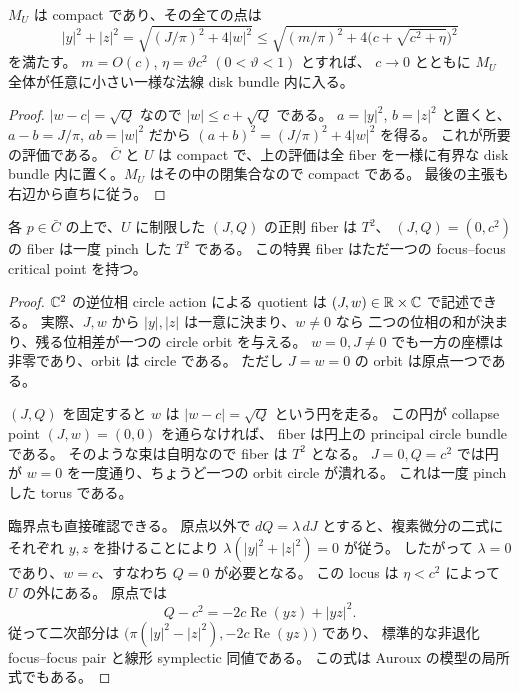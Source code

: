 \begin{lemma}\label{lc:construction-radius}
$M_U$ は compact であり、その全ての点は
\begin{equation}\label{lc:construction-radius-formula}
 |y|^2+|z|^2
 =\sqrt{(J/\pi)^2+4|w|^2}
 \le\sqrt{(m/\pi)^2+4\bigl(c+\sqrt{c^2+\eta}\bigr)^2}
\end{equation}
を満たす。
$m=O(c)$, $\eta=\vartheta c^2$ $(0<\vartheta<1)$ とすれば、
$c\to0$ とともに $M_U$ 全体が任意に小さい一様な法線 disk bundle 内に入る。
\end{lemma}

\begin{proof}
$|w-c|=\sqrt Q$ なので $|w|\le c+\sqrt Q$ である。
$a=|y|^2$, $b=|z|^2$ と置くと、
$a-b=J/\pi$, $ab=|w|^2$ だから
$(a+b)^2=(J/\pi)^2+4|w|^2$ を得る。
これが所要の評価である。
$\bar C$ と $U$ は compact で、上の評価は全 fiber を一様に有界な
disk bundle 内に置く。$M_U$ はその中の閉集合なので compact である。
最後の主張も右辺から直ちに従う。
\end{proof}

\begin{lemma}\label{lc:construction-normal-fibers}
各 $p\in\bar C$ の上で、$U$ に制限した $(J,Q)$ の正則 fiber は $T^2$、
$(J,Q)=(0,c^2)$ の fiber は一度 pinch した $T^2$ である。
この特異 fiber はただ一つの focus--focus critical point を持つ。
\end{lemma}

\begin{proof}
$\mathbb C^2$ の逆位相 circle action による quotient は
$(J,w)\in\mathbb R\times\mathbb C$ で記述できる。
実際、$J,w$ から $|y|,|z|$ は一意に決まり、$w\ne0$ なら
二つの位相の和が決まり、残る位相差が一つの circle orbit を与える。
$w=0,J\ne0$ でも一方の座標は非零であり、orbit は circle である。
ただし $J=w=0$ の orbit は原点一つである。

$(J,Q)$ を固定すると $w$ は $|w-c|=\sqrt Q$ という円を走る。
この円が collapse point $(J,w)=(0,0)$ を通らなければ、
fiber は円上の principal circle bundle である。
そのような束は自明なので fiber は $T^2$ となる。
$J=0,Q=c^2$ では円が $w=0$ を一度通り、ちょうど一つの orbit circle が潰れる。
これは一度 pinch した torus である。

臨界点も直接確認できる。
原点以外で $dQ=\lambda\,dJ$ とすると、複素微分の二式にそれぞれ
$y,z$ を掛けることにより $\lambda(|y|^2+|z|^2)=0$ が従う。
したがって $\lambda=0$ であり、$w=c$、すなわち $Q=0$ が必要となる。
この locus は $\eta<c^2$ によって $U$ の外にある。
原点では
\[
 Q-c^2=-2c\operatorname{Re}(yz)+|yz|^2.
\]
従って二次部分は
$\bigl(\pi(|y|^2-|z|^2),-2c\operatorname{Re}(yz)\bigr)$ であり、
標準的な非退化 focus--focus pair と線形 symplectic 同値である。
この式は Auroux の模型の局所式でもある\cite{auroux-local}。
\end{proof}

